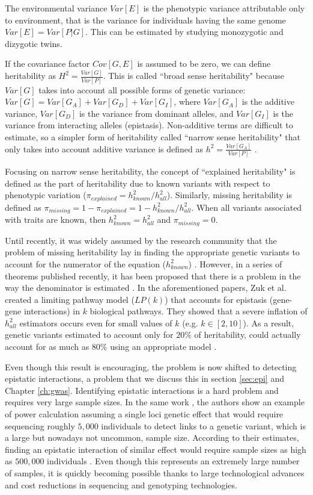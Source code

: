 The environmental variance $Var[E]$ is the phenotypic variance attributable only to environment, that is the variance for individuals having the same genome $Var[E] = Var[P|G]$. This can be estimated by studying monozygotic and dizygotic twins.

If the covariance factor $Cov[G, E]$ is assumed to be zero, we can define heritability as $H^2 = \frac{Var[G] }{ Var[P]}$. 
This is called ``broad sense heritability" because $Var[G]$ takes into account all possible forms of genetic variance: $Var[G] = Var[G_A] + Var[G_D] + Var[G_I]$, where $Var[G_A]$ is the additive variance, $Var[G_D]$ is the variance from dominant alleles, and $Var[G_I]$ is the variance from interacting alleles (epistasis). 
Non-additive terms are difficult to estimate, so a simpler form of heritability called ``narrow sense heritability" that only takes into account additive variance is defined as $h^2 = \frac{ Var[G_A] }{ Var[P] }$ \cite{zuk2012mystery}.

Focusing on narrow sense heritability, the concept of ``explained heritability" is defined as the part of heritability due to known variants with respect to phenotypic variation ($\pi_{explained} = h^2_{known} / h^2_{all}$). 
Similarly, missing heritability is defined as $\pi_{missing} = 1 - \pi_{explained} = 1 - h^2_{known} / h^2_{all}$. 
When all variants associated with traits are known, then $h^2_{known} = h^2_{all}$ and $\pi_{missing} = 0$.

Until recently, it was widely assumed by the research community that the problem of missing heritability lay in finding the appropriate genetic variants to account for the numerator of the equation ($h^2_{known}$) \cite{zuk2012mystery}. 
However, in a series of theorems published recently, it has been proposed that there is a problem in the way the denominator is estimated \cite{zuk2012mystery}. 
In the aforementioned papers, Zuk et al. created a limiting pathway model ($LP(k)$) that accounts for epistasis (gene-gene interactions) in $k$ biological pathways. They showed that a severe inflation of $h^2_{all}$ estimators occurs even for small values of $k$ (e.g. $k \in [2,10]$). 
As a result, genetic variants estimated to account only for $20\%$ of heritability, could actually account for as much as $80\%$ using an appropriate model \cite{zuk2012mystery}.

Even though this result is encouraging, the problem is now shifted to detecting epistatic interactions, a problem that we discuss this in section \ref{sec:epi} and Chapter \ref{ch:gwas}.
Identifying epistatic interactions is a hard problem and requires very large sample sizes. 
In the same work \cite{zuk2012mystery}, the authors show an example of power calculation assuming a single loci genetic effect that would require sequencing roughly $5,000$ individuals to detect links to a genetic variant, which is a large but nowadays not uncommon, sample size. 
According to their estimates, finding an epistatic interaction of similar effect would require sample sizes as high as  $500,000$ individuals \cite{zuk2012mystery}.
Even though this represents an extremely large number of samples, it is quickly becoming possible thanks to large technological advances and cost reductions in sequencing and genotyping technologies.

